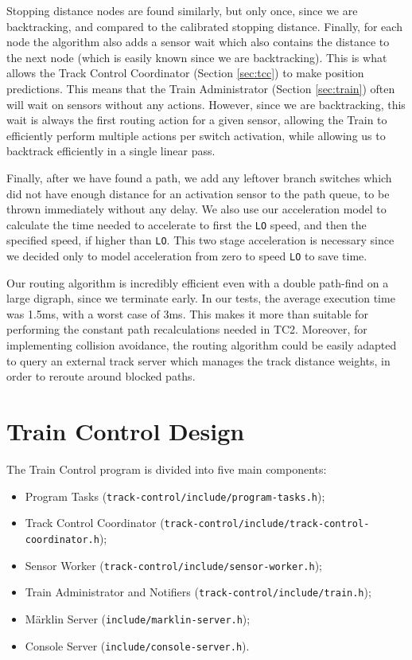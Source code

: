 \documentclass[12pt, titlepage]{article}
\begin{document}
    Stopping distance nodes are found similarly, but only once, since we are backtracking, and compared to the calibrated stopping distance. Finally, for each node the algorithm also adds a sensor wait which also contains the distance to the next node (which is easily known since we are backtracking). This is what allows the Track Control Coordinator (Section \ref{sec:tcc}) to make position predictions. This means that the Train Administrator (Section \ref{sec:train}) often will wait on sensors without any actions. However, since we are backtracking, this wait is always the first routing action for a given sensor, allowing the Train to efficiently perform multiple actions per switch activation, while allowing us to backtrack efficiently in a single linear pass.
    
    Finally, after we have found a path, we add any leftover branch switches which did not have enough distance for an activation sensor to the path queue, to be thrown immediately without any delay. We also use our acceleration model to calculate the time needed to accelerate to first the \verb`LO` speed, and then the specified speed, if higher than \verb`LO`. This two stage acceleration is necessary since we decided only to model acceleration from zero to speed \verb`LO` to save time. 
    
    Our routing algorithm is incredibly efficient even with a double path-find on a large digraph, since we terminate early. In our tests, the average execution time was 1.5ms, with a worst case of 3ms. This makes it more than suitable for performing the constant path recalculations needed in TC2. Moreover, for implementing collision avoidance, the routing algorithm could be easily adapted to query an external track server which manages the track distance weights, in order to reroute around blocked paths.

    \section{Train Control Design}
    The Train Control program is divided into five main components:
    \begin{itemize}
        \item Program Tasks (\verb`track-control/include/program-tasks.h`);
        \item Track Control Coordinator (\verb`track-control/include/track-control-coordinator.h`);
        \item Sensor Worker (\verb`track-control/include/sensor-worker.h`);
        \item Train Administrator and Notifiers (\verb`track-control/include/train.h`);
        \item Märklin Server (\verb`include/marklin-server.h`);
        \item Console Server (\verb`include/console-server.h`).
    \end{itemize}
    
\end{document}
